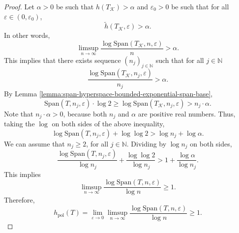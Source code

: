 \documentclass[10pt,a4paper]{amsart}
\newcommand*\induce[1]{#1_\mathcal{K}}
\begin{document}
\begin{proof}
    Let $\alpha > 0$ be such that $h(\induce{T}) > \alpha$ and $\varepsilon_0 > 0$ be such that for all $\varepsilon \in (0, \varepsilon_0)$,
    \begin{equation*}
        \widetilde{h}(\induce{T}, \varepsilon) > \alpha. 
    \end{equation*}
    In other words, 
    \begin{equation*}
        \limsup\limits_{n \to \infty} \frac{\log \text{Span}(\induce{T}, n, \varepsilon)}{n} > \alpha.
    \end{equation*}
    This implies that there exists sequence $(n_j)_{j \in \mathbb{N}}$ such that for all $j \in \mathbb{N}$
    \begin{equation*}
        \frac{\log \text{Span}(\induce{T}, n_j, \varepsilon)}{n_j} > \alpha.
    \end{equation*}
    By Lemma \ref{lemma:span-hyperspace-bounded-exponential-span-base}, 
    \begin{equation*}
        \text{Span}(T, n_j, \varepsilon)\cdot\log 2 \geq \log \text{Span}(\induce{T}, n_j, \varepsilon) > n_j\cdot\alpha.
    \end{equation*}
    Note that $n_j \cdot \alpha > 0$, because both $n_j$ and $\alpha$ are positive real numbers. Thus, taking the $\log$ on both sides of the above inequality,
    \begin{equation*}
        \log \text{Span}(T, n_j, \varepsilon) + \log\log 2 > \log n_j + \log\alpha.
    \end{equation*}
    We can assume that $n_j \geq 2$, for all $j \in \mathbb{N}$. Dividing by $\log n_j$ on both sides,
    \begin{equation*}
        \frac{\log \text{Span}(T, n_j, \varepsilon)}{\log n_j} + \frac{\log\log 2}{\log n_j} > 1 + \frac{\log\alpha}{\log n_j}.
    \end{equation*}
    This implies
    \begin{equation*}
        \limsup\limits_{n \to \infty} \frac{\log \text{Span}(T, n, \varepsilon)}{\log n} \geq 1.
    \end{equation*}
    Therefore,
    \begin{equation*}
        h_{\text{pol}}(T) = \lim\limits_{\varepsilon \to 0}\limsup\limits_{n \to \infty} \frac{\log \text{Span}(T, n, \varepsilon)}{\log n} \geq 1.
    \end{equation*}
\end{proof}
\end{document}
